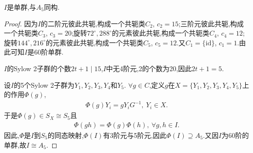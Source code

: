 \documentclass[../../main.tex]{subfiles}%
\begin{document}
\begin{theorem}
$I$是单群,与$A_5$同构.
\end{theorem}
\begin{proof}

因为$I$的二阶元彼此共轭,构成一个共轭类$C_2$, $c_2=15$;三阶元彼此共轭,构成一个共轭类$C_3$, $c_3=20$;旋转$72^\circ,288^\circ$的元素彼此共轭,构成一个共轭类$C_4$, $c_4=12$;旋转$144^\circ,216^\circ$的元素彼此共轭,构成一个共轭类$C_5$, $c_5=12$.又$C_1=\{\text{id}\}$, $c_1=1$.由此可知$I$是60阶单群.

$I$的Sylow 2子群的个数$2t+1\mid15$,$I$中无4阶元,2的个数为20,因此$2t+1=5$.

设$I$的5个Sylow 2子群为$Y_1,Y_2,Y_3,Y_4$和$Y_5$. $\forall g\in C$,定义$g$在$X=\{Y_1,Y_2,Y_3,Y_4,Y_5\}$上的作用$\Phi(g)$,
\begin{align*}
\Phi(g)Y_i=gY_iG^{-1},\ Y_i\in X.
\end{align*}
于是$\Phi(g)\in S_X\cong S_5$且
\begin{align*}
\Phi(gh)=\Phi(g)\Phi(h),\ \forall g,h\in I.
\end{align*}
因此,$\Phi$是$I$到$S_5$的同态映射,$\Phi(I)$有3阶元与5阶元,因此$\Phi(I)\supseteq A_5$.又因$I$为60阶的单群,故$I\cong A_5$.

\end{proof}
\end{document}
